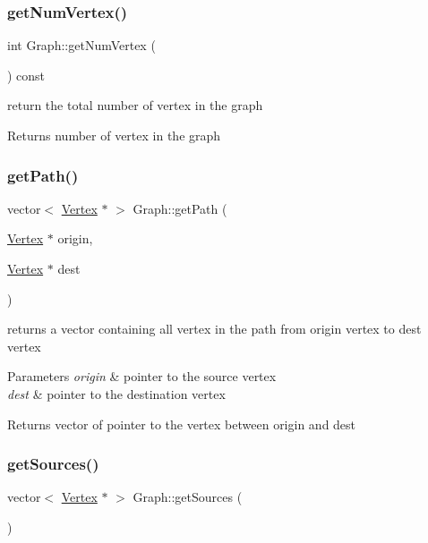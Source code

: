 \subsubsection{\texorpdfstring{get\+Num\+Vertex()}{getNumVertex()}}
{\footnotesize\ttfamily int Graph\+::get\+Num\+Vertex (\begin{DoxyParamCaption}{ }\end{DoxyParamCaption}) const}



return the total number of vertex in the graph 

\begin{DoxyReturn}{Returns}
number of vertex in the graph 
\end{DoxyReturn}
\hypertarget{class_graph_a02923471911e67d955d3334e77fb4ab0}{}\label{class_graph_a02923471911e67d955d3334e77fb4ab0} 
\subsubsection{\texorpdfstring{get\+Path()}{getPath()}}
{\footnotesize\ttfamily vector$<$ \hyperlink{class_vertex}{Vertex} $\ast$ $>$ Graph\+::get\+Path (\begin{DoxyParamCaption}\item[{\hyperlink{class_vertex}{Vertex} $\ast$}]{origin,  }\item[{\hyperlink{class_vertex}{Vertex} $\ast$}]{dest }\end{DoxyParamCaption})}



returns a vector containing all vertex in the path from origin vertex to dest vertex 


\begin{DoxyParams}{Parameters}
{\em origin} & pointer to the source vertex\\
\hline
{\em dest} & pointer to the destination vertex\\
\hline
\end{DoxyParams}
\begin{DoxyReturn}{Returns}
vector of pointer to the vertex between origin and dest 
\end{DoxyReturn}
\hypertarget{class_graph_a920bec27ba394f02f3d6b3aeefd7a8b0}{}\label{class_graph_a920bec27ba394f02f3d6b3aeefd7a8b0} 
\subsubsection{\texorpdfstring{get\+Sources()}{getSources()}}
{\footnotesize\ttfamily vector$<$ \hyperlink{class_vertex}{Vertex} $\ast$ $>$ Graph\+::get\+Sources (\begin{DoxyParamCaption}{ }\end{DoxyParamCaption})}



